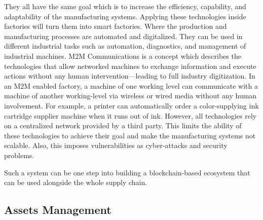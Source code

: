 \documentclass[runningheads]{llncs}
\begin{document}
They all have the same goal which is to increase the efficiency, capability, and adaptability of the manufacturing systems. Applying these technologies inside factories will turn them into smart factories. Where the production and manufacturing processes are automated and digitalized. They can be used in different industrial tasks such as automation, diagnostics, and management of industrial machines. M2M Communications is a concept which describes the technologies that allow networked machines to exchange information and execute actions without any human intervention—leading to full industry digitization. In an M2M enabled factory, a machine of one working level can communicate with a machine of another working-level via wireless or wired media without any human involvement.  For example, a printer can automatically order a color-supplying ink cartridge supplier machine when it runs out of ink. However, all technologies rely on a centralized network provided by a third party. This limits the ability of these technologies to achieve their goal and make the manufacturing systems not scalable. Also, this imposes vulnerabilities as cyber-attacks and security problems.  


 Such a system can be one step into building a blockchain-based ecosystem that can be used alongside the whole supply chain.

\subsection{Assets Management}



\end{document}
